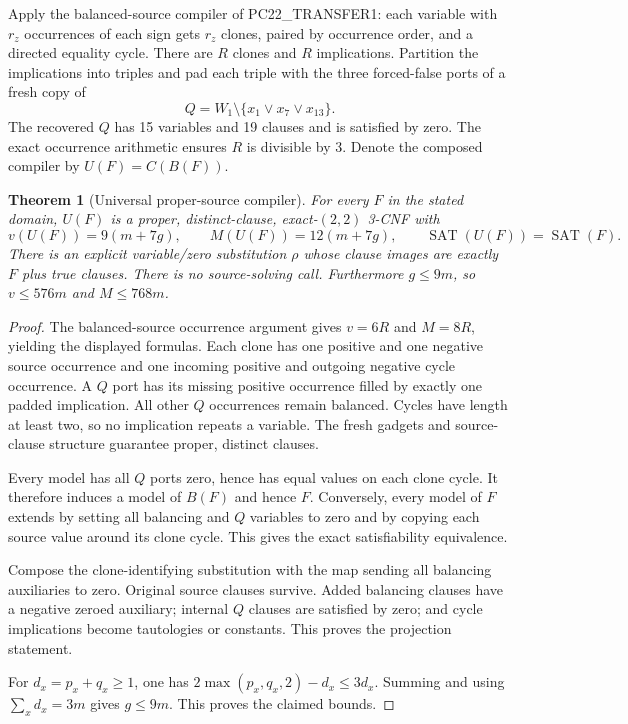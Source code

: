 \documentclass[11pt]{article}
\newtheorem{theorem}{Theorem}
\newcommand{\SAT}{\operatorname{SAT}}
\begin{document}
Apply the balanced-source compiler of PC22\_TRANSFER1: each variable with
$r_z$ occurrences of each sign gets $r_z$ clones, paired by occurrence order,
and a directed equality cycle. There are $R$ clones and $R$ implications.
Partition the implications into triples and pad each triple with the three
forced-false ports of a fresh copy of
\[
Q=W_1\setminus\{x_1\lor x_7\lor x_{13}\}.
\]
The recovered $Q$ has 15 variables and 19 clauses and is satisfied by zero.
The exact occurrence arithmetic ensures $R$ is divisible by 3. Denote the
composed compiler by $U(F)=C(B(F))$.

\begin{theorem}[Universal proper-source compiler]\label{thm:universal}
For every $F$ in the stated domain, $U(F)$ is a proper, distinct-clause,
exact-$(2,2)$ 3-CNF with
\[
 v(U(F))=9(m+7g),\qquad M(U(F))=12(m+7g),
 \qquad \SAT(U(F))=\SAT(F).
\]
There is an explicit variable/zero substitution $\rho$ whose clause images
are exactly $F$ plus true clauses. There is no source-solving call.
Furthermore $g\le9m$, so $v\le576m$ and $M\le768m$.
\end{theorem}
\begin{proof}
The balanced-source occurrence argument gives $v=6R$ and $M=8R$, yielding
the displayed formulas. Each clone has one positive and one negative source
occurrence and one incoming positive and outgoing negative cycle occurrence.
A $Q$ port has its missing positive occurrence filled by exactly one padded
implication. All other $Q$ occurrences remain balanced. Cycles have length at
least two, so no implication repeats a variable. The fresh gadgets and
source-clause structure guarantee proper, distinct clauses.

Every model has all $Q$ ports zero, hence has equal values on each clone cycle.
It therefore induces a model of $B(F)$ and hence $F$. Conversely, every model
of $F$ extends by setting all balancing and $Q$ variables to zero and by
copying each source value around its clone cycle. This gives the exact
satisfiability equivalence.

Compose the clone-identifying substitution with the map sending all balancing
auxiliaries to zero. Original source clauses survive. Added balancing clauses
have a negative zeroed auxiliary; internal $Q$ clauses are satisfied by zero;
and cycle implications become tautologies or constants. This proves the
projection statement.

For $d_x=p_x+q_x\ge1$, one has
$2\max(p_x,q_x,2)-d_x\le3d_x$. Summing and using $\sum_xd_x=3m$
gives $g\le9m$. This proves the claimed bounds.
\end{proof}
\end{document}

